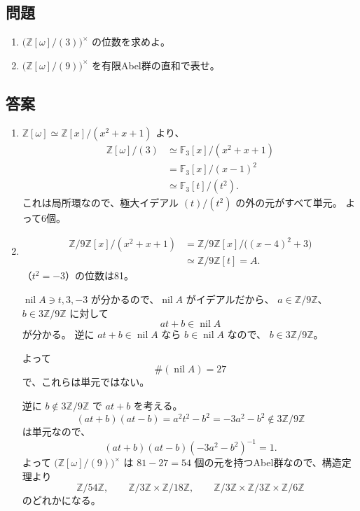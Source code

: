 \subsection*{問題}

\begin{enumerate}
  \item $\bigl(\mathbb{Z}[\omega]/(3)\bigr)^{\times}$ の位数を求めよ。
  \item $\bigl(\mathbb{Z}[\omega]/(9)\bigr)^{\times}$ を有限Abel群の直和で表せ。
\end{enumerate}

\subsection*{答案}

\begin{enumerate}
  \item
  $\mathbb{Z}[\omega]\simeq\mathbb{Z}[x]/(x^2+x+1)$ より、
  \begin{align*}
    \mathbb{Z}[\omega]/(3)
      &\simeq \mathbb{F}_3[x]/(x^2+x+1) \\
      &= \mathbb{F}_3[x]/(x-1)^2 \\
      &\simeq \mathbb{F}_3[t]/(t^2).
  \end{align*}
  これは局所環なので、極大イデアル $(t)/(t^2)$ の外の元がすべて単元。
  よって6個。

  \item
  \begin{align*}
    \mathbb{Z}/9\mathbb{Z}[x]/(x^2+x+1)
      &= \mathbb{Z}/9\mathbb{Z}[x]/\bigl((x-4)^2+3\bigr) \\
      &\simeq \mathbb{Z}/9\mathbb{Z}[t]=A.
  \end{align*}
  （$t^2=-3$）の位数は81。

  $\operatorname{nil}A\ni t,3,-3$ が分かるので、$\operatorname{nil}A$ がイデアルだから、
  $a\in\mathbb{Z}/9\mathbb{Z}$、$b\in3\mathbb{Z}/9\mathbb{Z}$ に対して
  \[
    at+b\in\operatorname{nil}A
  \]
  が分かる。
  逆に $at+b\in\operatorname{nil}A$ なら $b\in\operatorname{nil}A$ なので、
  $b\in3\mathbb{Z}/9\mathbb{Z}$。

  よって
  \[
    \#(\operatorname{nil}A)=27
  \]
  で、これらは単元ではない。

  逆に $b\notin3\mathbb{Z}/9\mathbb{Z}$ で $at+b$ を考える。
  \[
    (at+b)(at-b)=a^2t^2-b^2=-3a^2-b^2
      \notin3\mathbb{Z}/9\mathbb{Z}
  \]
  は単元なので、
  \[
    (at+b)(at-b)(-3a^2-b^2)^{-1}=1.
  \]
  よって $\bigl(\mathbb{Z}[\omega]/(9)\bigr)^{\times}$ は
  $81-27=54$ 個の元を持つAbel群なので、構造定理より
  \[
    \mathbb{Z}/54\mathbb{Z},\qquad
    \mathbb{Z}/3\mathbb{Z}\times\mathbb{Z}/18\mathbb{Z},\qquad
    \mathbb{Z}/3\mathbb{Z}\times\mathbb{Z}/3\mathbb{Z}\times\mathbb{Z}/6\mathbb{Z}
  \]
  のどれかになる。


\end{enumerate}
